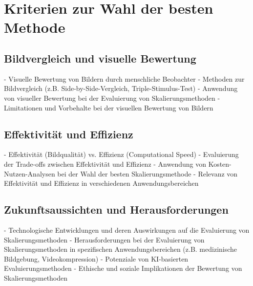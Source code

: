 \section{Kriterien zur Wahl der besten Methode}
\subsection{Bildvergleich und visuelle Bewertung}

- Visuelle Bewertung von Bildern durch menschliche Beobachter
- Methoden zur Bildvergleich (z.B. Side-by-Side-Vergleich, Triple-Stimulus-Test)
- Anwendung von visueller Bewertung bei der Evaluierung von Skalierungsmethoden
- Limitationen und Vorbehalte bei der visuellen Bewertung von Bildern

\subsection{Effektivität und Effizienz}

- Effektivität (Bildqualität) vs. Effizienz (Computational Speed)
- Evaluierung der Trade-offs zwischen Effektivität und Effizienz
- Anwendung von Kosten-Nutzen-Analysen bei der Wahl der besten Skalierungsmethode
- Relevanz von Effektivität und Effizienz in verschiedenen Anwendungsbereichen

\subsection{Zukunftsaussichten und Herausforderungen}

- Technologische Entwicklungen und deren Auswirkungen auf die Evaluierung von Skalierungsmethoden
- Herausforderungen bei der Evaluierung von Skalierungsmethoden in spezifischen Anwendungsbereichen (z.B. medizinische Bildgebung, Videokompression)
- Potenziale von KI-basierten Evaluierungsmethoden
- Ethische und soziale Implikationen der Bewertung von Skalierungsmethoden

\newpage